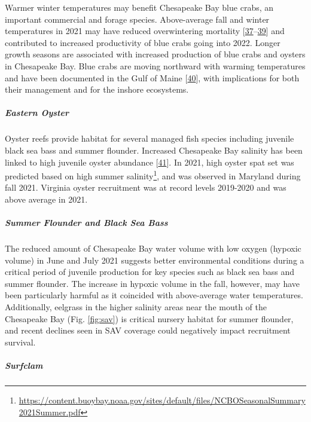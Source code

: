 \documentclass[
  10pt,
]{article}
\begin{document}
Warmer winter temperatures may benefit Chesapeake Bay blue crabs, an
important commercial and forage species. Above-average fall and winter
temperatures in 2021 may have reduced overwintering mortality
{[}\protect\hyperlink{ref-bauer_temperature-_2010}{37}--\protect\hyperlink{ref-rome_linking_2005}{39}{]}
and contributed to increased productivity of blue crabs going into 2022.
Longer growth seasons are associated with increased production of blue
crabs and oysters in Chesapeake Bay. Blue crabs are moving northward
with warming temperatures and have been documented in the Gulf of Maine
{[}\protect\hyperlink{ref-johnson_savory_2015}{40}{]}, with implications
for both their management and for the inshore ecosystems.

\hypertarget{eastern-oyster}{%
\subparagraph{\texorpdfstring{\emph{Eastern
Oyster}}{Eastern Oyster}}\label{eastern-oyster}}

Oyster reefs provide habitat for several managed fish species including
juvenile black sea bass and summer flounder. Increased Chesapeake Bay
salinity has been linked to high juvenile oyster abundance
{[}\protect\hyperlink{ref-kimmel_relationship_2014}{41}{]}. In 2021,
high oyster spat set was predicted based on high summer
salinity\footnote{\url{https://content.buoybay.noaa.gov/sites/default/files/NCBOSeasonalSummary2021Summer.pdf}},
and was observed in Maryland during fall 2021. Virginia oyster
recruitment was at record levels 2019-2020 and was above average in
2021.

\hypertarget{summer-flounder-and-black-sea-bass}{%
\subparagraph{\texorpdfstring{\emph{Summer Flounder and Black Sea
Bass}}{Summer Flounder and Black Sea Bass}}\label{summer-flounder-and-black-sea-bass}}

The reduced amount of Chesapeake Bay water volume with low oxygen
(hypoxic volume) in June and July 2021 suggests better environmental
conditions during a critical period of juvenile production for key
species such as black sea bass and summer flounder. The increase in
hypoxic volume in the fall, however, may have been particularly harmful
as it coincided with above-average water temperatures. Additionally,
eelgrass in the higher salinity areas near the mouth of the Chesapeake
Bay (Fig. \ref{fig:sav}) is critical nursery habitat for summer
flounder, and recent declines seen in SAV coverage could negatively
impact recruitment survival.

\hypertarget{surfclam}{%
\subparagraph{\texorpdfstring{\emph{Surfclam}}{Surfclam}}\label{surfclam}}
\end{document}
